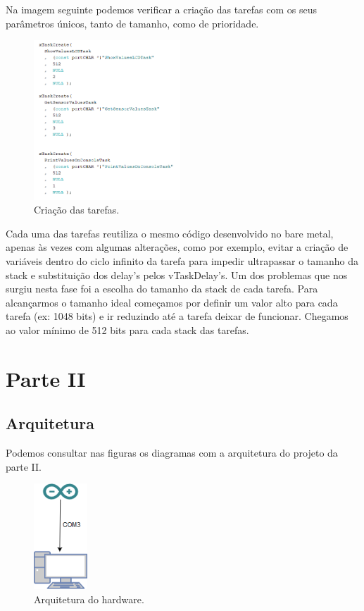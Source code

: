 \documentclass[11pt]{report}
\begin{document}
Na imagem seguinte podemos verificar a criação das tarefas com os seus parâmetros únicos, tanto de tamanho, como de prioridade.

\begin{figure} [!h]
\centering
\includegraphics[width=55mm]{Prints/task.png}
\caption{Criação das tarefas.}
\end{figure}

\clearpage


Cada uma das tarefas reutiliza o mesmo código desenvolvido no bare metal, apenas às vezes com algumas alterações, como por exemplo, evitar a criação de variáveis dentro do ciclo infinito da tarefa para impedir ultrapassar o tamanho da stack e substituição dos delay's pelos  vTaskDelay's. Um dos problemas que nos surgiu nesta fase foi a escolha do tamanho da stack de cada tarefa. Para alcançarmos o tamanho ideal começamos por definir um valor alto para cada tarefa (ex: 1048 bits) e ir reduzindo até a tarefa deixar de funcionar. Chegamos ao valor mínimo de 512 bits para cada stack das tarefas.


\clearpage


\chapter*{Parte II}

\section*{Arquitetura}

Podemos consultar nas figuras os diagramas com a arquitetura do projeto da parte II.

\begin{figure} [!h]
\centering
\includegraphics[width=20mm]{Prints/arquitectura2hard.png}
\caption{Arquitetura do hardware.}
\end{figure}
\end{document}
